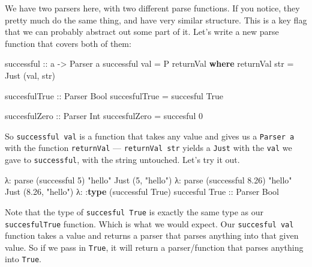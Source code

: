 \documentclass[]{article}
\newenvironment{Shaded}{}{}
\newcommand{\KeywordTok}[1]{\textcolor[rgb]{0.00,0.44,0.13}{\textbf{{#1}}}}
\newcommand{\DataTypeTok}[1]{\textcolor[rgb]{0.56,0.13,0.00}{{#1}}}
\newcommand{\DecValTok}[1]{\textcolor[rgb]{0.25,0.63,0.44}{{#1}}}
\newcommand{\FloatTok}[1]{\textcolor[rgb]{0.25,0.63,0.44}{{#1}}}
\newcommand{\StringTok}[1]{\textcolor[rgb]{0.25,0.44,0.63}{{#1}}}
\newcommand{\OtherTok}[1]{\textcolor[rgb]{0.00,0.44,0.13}{{#1}}}
\newcommand{\FunctionTok}[1]{\textcolor[rgb]{0.02,0.16,0.49}{{#1}}}
\newcommand{\NormalTok}[1]{{#1}}
\begin{document}
We have two parsers here, with two different parse functions. If you notice, they pretty much do the
same thing, and have very similar structure. This is a key flag that we can probably abstract out
some part of it. Let's write a new parse function that covers both of them:

\begin{Shaded}
\begin{Highlighting}[]
\OtherTok{successful ::} \NormalTok{a }\OtherTok{->} \DataTypeTok{Parser} \NormalTok{a}
\NormalTok{successful val }\FunctionTok{=} \DataTypeTok{P} \NormalTok{returnVal}
    \KeywordTok{where}
        \NormalTok{returnVal str }\FunctionTok{=} \DataTypeTok{Just} \NormalTok{(val, str)}

\OtherTok{succesfulTrue ::} \DataTypeTok{Parser} \DataTypeTok{Bool}
\NormalTok{succesfulTrue }\FunctionTok{=} \NormalTok{succesful }\DataTypeTok{True}

\OtherTok{succesfulZero ::} \DataTypeTok{Parser} \DataTypeTok{Int}
\NormalTok{succesfulZero }\FunctionTok{=} \NormalTok{succesful }\DecValTok{0}
\end{Highlighting}
\end{Shaded}

So \texttt{successful\ val} is a function that takes any value and gives us a \texttt{Parser\ a}
with the function \texttt{returnVal} --- \texttt{returnVal\ str} yields a \texttt{Just} with the
\texttt{val} we gave to \texttt{successful}, with the string untouched. Let's try it out.

\begin{Shaded}
\begin{Highlighting}[]
\NormalTok{λ}\FunctionTok{:} \NormalTok{parse (successful }\DecValTok{5}\NormalTok{) }\StringTok{"hello"}
\DataTypeTok{Just} \NormalTok{(}\DecValTok{5}\NormalTok{, }\StringTok{"hello"}\NormalTok{)}
\NormalTok{λ}\FunctionTok{:} \NormalTok{parse (successful }\FloatTok{8.26}\NormalTok{) }\StringTok{"hello"}
\DataTypeTok{Just} \NormalTok{(}\FloatTok{8.26}\NormalTok{, }\StringTok{"hello"}\NormalTok{)}
\NormalTok{λ}\FunctionTok{:} \FunctionTok{:}\KeywordTok{type} \NormalTok{(successful }\DataTypeTok{True}\NormalTok{)}
\NormalTok{succesful }\DataTypeTok{True}\OtherTok{ ::} \DataTypeTok{Parser} \DataTypeTok{Bool}
\end{Highlighting}
\end{Shaded}

Note that the type of \texttt{succesful\ True} is exactly the same type as our
\texttt{succesfulTrue} function. Which is what we would expect. Our \texttt{succesful\ val} function
takes a value and returns a parser that parses anything into that given value. So if we pass in
\texttt{True}, it will return a parser/function that parses anything into \texttt{True}.
\end{document}

